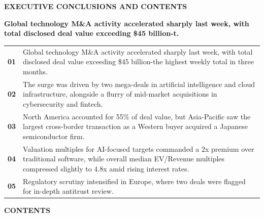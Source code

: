 \documentclass[10pt,a4paper]{article}
\begin{document}
{\textcolor{BOBlue}{\scriptsize\bfseries EXECUTIVE CONCLUSIONS AND CONTENTS}}\par\vspace{-1pt}
{\Large\sffamily\bfseries\color{BONavy} Global technology M\&A activity accelerated sharply last week, with total disclosed deal value exceeding \$45 billion-t.}\par\vspace{4pt}
\vspace{2pt}{\color{BOBright}\rule{\linewidth}{1pt}}\vspace{5pt}
\begin{tabularx}{\linewidth}{p{12mm}Y}
\textcolor{BOBlue}{\bfseries 01} & {\footnotesize Global technology M\&A activity accelerated sharply last week, with total disclosed deal value exceeding \$45 billion-the highest weekly total in three months.} \\[4pt]
\textcolor{BOBlue}{\bfseries 02} & {\footnotesize The surge was driven by two mega-deals in artificial intelligence and cloud infrastructure, alongside a flurry of mid-market acquisitions in cybersecurity and fintech.} \\[4pt]
\textcolor{BOBlue}{\bfseries 03} & {\footnotesize North America accounted for 55\% of deal value, but Asia-Pacific saw the largest cross-border transaction as a Western buyer acquired a Japanese semiconductor firm.} \\[4pt]
\textcolor{BOBlue}{\bfseries 04} & {\footnotesize Valuation multiples for AI-focused targets commanded a 2x premium over traditional software, while overall median EV/Revenue multiples compressed slightly to 4.8x amid rising interest rates.} \\[4pt]
\textcolor{BOBlue}{\bfseries 05} & {\footnotesize Regulatory scrutiny intensified in Europe, where two deals were flagged for in-depth antitrust review.} \\[4pt]
\end{tabularx}
\vspace{6pt}
{\textcolor{BOBlue}{\scriptsize\bfseries CONTENTS}}\par\vspace{2pt}
\end{document}
